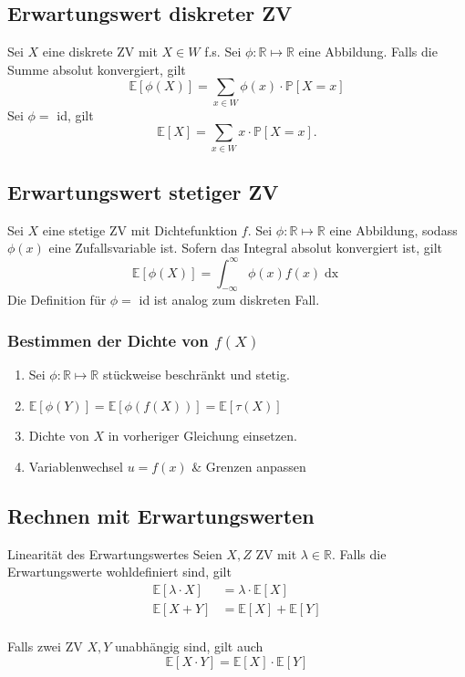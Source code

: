 \documentclass[a4paper,10pt]{article}
\def\R{\mathbb{R}}
\def\P{\mathbb{P}}
\def\E{\mathbb{E}}
\begin{document}
\subsection{Erwartungswert diskreter ZV}
Sei \(X\) eine diskrete ZV mit \(X \in W\) f.s. Sei \(\phi: \R \mapsto \R\) eine Abbildung. Falls die Summe absolut konvergiert, gilt
\[\E[\phi(X)] = \sum_{x\in W} \phi(x)\cdot \P[X=x]\]
Sei \(\phi = \) id, gilt
\[
	\E[X] = \sum_{x\in W} x \cdot \P[X=x]
	.\]

\subsection{Erwartungswert stetiger ZV}
Sei \(X\) eine stetige ZV mit Dichtefunktion \(f\). Sei \(\phi :\R\mapsto \R\) eine Abbildung, sodass \(\phi(x)\) eine Zufallsvariable ist. Sofern das Integral absolut konvergiert ist, gilt
\[\E[\phi(X)] = \int_{-\infty}^{\infty}\phi(x)f(x) \mathop{dx}\]
Die Definition für \(\phi = \) id ist analog zum diskreten Fall.
\subsubsection{\texorpdfstring{Bestimmen der Dichte von \(f(X)\)}{Bestimmen der Dichte von f(X)}}
\begin{enumerate}
	\item Sei \(\phi: \R \mapsto \R\) stückweise beschränkt und stetig.
	\item \(\E[\phi(Y)] = \E[\phi(f(X))] = \E[\tau(X)]\)
	\item Dichte von \(X\) in vorheriger Gleichung einsetzen.
	\item Variablenwechsel \(u = f(x)\) \& Grenzen anpassen
\end{enumerate}

\subsection{Rechnen mit Erwartungswerten}
\begin{subbox}{Linearität des Erwartungswertes}
	Seien \(X,Z\) ZV mit \(\lambda \in \R\). Falls die Erwartungswerte wohldefiniert sind, gilt
	\begin{align*}
		\E[\lambda \cdot X] & = \lambda \cdot \E[X] \\
		\E[X + Y]           & = \E[X] + \E[Y]       \\
	\end{align*}
\end{subbox}
Falls zwei ZV \(X,Y\) unabhängig sind, gilt auch
\[\E[X\cdot Y] = \E[X] \cdot \E[Y]\]
\end{document}
